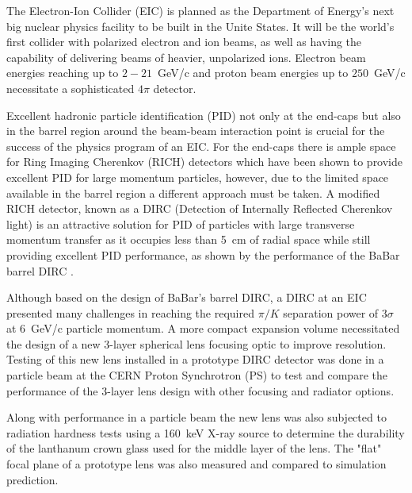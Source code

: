 \label{ch:intro}
The Electron-Ion Collider (EIC) is planned as the Department of Energy's next big nuclear physics facility to be built in the Unite States. It will be the world's first collider with polarized electron and ion beams, as well as having the capability of delivering beams of heavier, unpolarized ions. Electron beam energies reaching up to $2-21$~GeV/c and proton beam energies up to $250$~GeV/c necessitate a sophisticated $4\pi$ detector. 

Excellent hadronic particle identification (PID) not only at the end-caps but also in the barrel region around the beam-beam interaction point is crucial for the success of the physics program of an EIC. For the end-caps there is ample space for Ring Imaging Cherenkov (RICH) detectors which have been shown to provide excellent PID for large momentum particles, however, due to the limited space available in the barrel region a different approach must be taken. A modified RICH detector, known as a DIRC (Detection of Internally Reflected Cherenkov light) is an attractive solution for PID of particles with large transverse momentum transfer as it occupies less than 5~cm of radial space while still providing excellent PID performance, as shown by the performance of the BaBar barrel DIRC \cite{BaBarDIRC}.

Although based on the design of BaBar's barrel DIRC, a DIRC at an EIC presented many challenges in reaching the required $\pi/K$ separation power of $3\sigma$ at 6~GeV/c particle momentum. A more compact expansion volume necessitated the design of a new 3-layer spherical lens focusing optic to improve resolution. Testing of this new lens installed in a prototype DIRC detector was done in a particle beam at the CERN Proton Synchrotron (PS) to test and compare the performance of the 3-layer lens design with other focusing and radiator options.

Along with performance in a particle beam the new lens was also subjected to radiation hardness tests using a 160~keV X-ray source to determine the durability of the lanthanum crown glass used for the middle layer of the lens. The "flat" focal plane of a prototype lens was also measured and compared to simulation prediction.